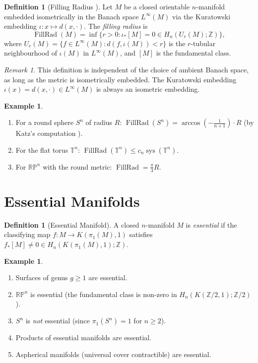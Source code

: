 \documentclass[12pt,a4paper]{amsart}
\theoremstyle{definition}
\newtheorem{definition}[theorem]{Definition}
\newtheorem{example}[theorem]{Example}
\theoremstyle{remark}
\newtheorem{remark}[theorem]{Remark}
\DeclareMathOperator{\sys}{sys}
\DeclareMathOperator{\FillRad}{FillRad}
\newcommand{\ZZ}{\mathbb{Z}}
\newcommand{\RP}{\mathbb{RP}}
\newcommand{\TT}{\mathbb{T}}
\begin{document}
\begin{definition}[Filling Radius \cite{Gromov1983}]
Let $M$ be a closed orientable $n$-manifold embedded isometrically in the
Banach space $L^\infty(M)$ via the Kuratowski embedding
$\iota \colon x \mapsto d(x,\cdot)$.  The \emph{filling radius} is
\[
  \FillRad(M) = \inf\bigl\{ r > 0 : \iota_*[M] = 0 \in H_n(U_r(M);\ZZ)
  \bigr\},
\]
where $U_r(M) = \{f \in L^\infty(M) : d(f, \iota(M)) < r\}$ is the
$r$-tubular neighbourhood of $\iota(M)$ in $L^\infty(M)$, and $[M]$ is
the fundamental class.
\end{definition}

\begin{remark}
This definition is independent of the choice of ambient Banach space,
as long as the metric is isometrically embedded.  The Kuratowski embedding
$\iota(x) = d(x,\cdot) \in L^\infty(M)$ is always an isometric embedding.
\end{remark}

\begin{example}
\begin{enumerate}[label=(\roman*)]
  \item For a round sphere $S^n$ of radius $R$: $\FillRad(S^n) = \arccos(-\tfrac{1}{n+1}) \cdot R$
        (by Katz's computation \cite{Katz1983}).
  \item For the flat torus $\TT^n$: $\FillRad(\TT^n) \le c_n \sys(\TT^n)$.
  \item For $\RP^n$ with the round metric: $\FillRad = \tfrac{\pi}{3} R$.
\end{enumerate}
\end{example}

\section{Essential Manifolds}

\begin{definition}[Essential Manifold]
A closed $n$-manifold $M$ is \emph{essential} if the classifying map
$f \colon M \to K(\pi_1(M), 1)$ satisfies $f_*[M] \neq 0 \in
H_n(K(\pi_1(M),1);\ZZ)$.
\end{definition}

\begin{example}
\begin{enumerate}[label=(\roman*)]
  \item Surfaces of genus $g \ge 1$ are essential.
  \item $\RP^n$ is essential (the fundamental class is non-zero in
        $H_n(K(\ZZ/2,1);\ZZ/2)$).
  \item $S^n$ is \emph{not} essential (since $\pi_1(S^n) = 1$ for $n \ge 2$).
  \item Products of essential manifolds are essential.
  \item Aspherical manifolds (universal cover contractible) are essential.
\end{enumerate}
\end{example}
\end{document}

